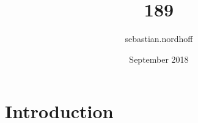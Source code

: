 \documentclass{article}
\title{189}
\author{sebastian.nordhoff }
\date{September 2018}
\begin{document}
\maketitle

\section{Introduction}
\end{document}
